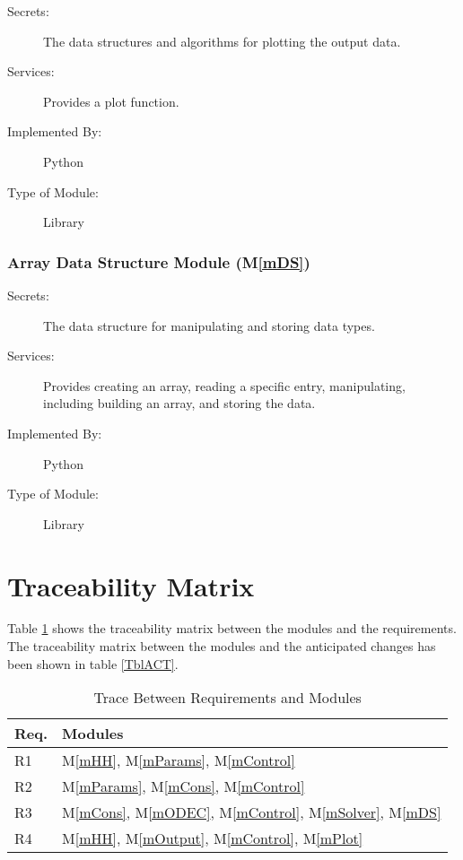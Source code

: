 \documentclass[12pt, titlepage]{article}
\newcommand{\mref}[1]{M\ref{#1}}
\begin{document}
\begin{description}
\item[Secrets:] The data structures and algorithms for plotting the output data.
\item[Services:] Provides a plot function.
\item[Implemented By:] Python
\item[Type of Module:] Library
\end{description}

\subsubsection{ Array Data Structure Module (\mref{mDS})}

\begin{description}
\item[Secrets:] The data structure for manipulating and storing data types.
\item[Services:] Provides creating an array, reading a specific entry, manipulating, including building an array, and storing the data.
\item[Implemented By:] Python
\item[Type of Module:] Library
\end{description}

\section{Traceability Matrix} \label{SecTM}

Table \ref{TblRT} shows the traceability matrix between the modules and the
requirements. The traceability matrix between the modules and the anticipated changes has been shown in table \ref{TblACT}.

\begin{table}[H]
\centering
\begin{tabular}{p{} p{}}
\toprule
\textbf{Req.} & \textbf{Modules}\\
\midrule
R1 &  \mref{mHH}, \mref{mParams}, \mref{mControl}\\
R2 & \mref{mParams}, \mref{mCons}, \mref{mControl}\\
R3 & \mref{mCons}, \mref{mODEC}, \mref{mControl}, \mref{mSolver}, \mref{mDS}\\
R4 & \mref{mHH}, \mref{mOutput}, \mref{mControl}, \mref{mPlot}\\

\bottomrule
\end{tabular}
\caption{Trace Between Requirements and Modules}
\label{TblRT}
\end{table}
\end{document}
